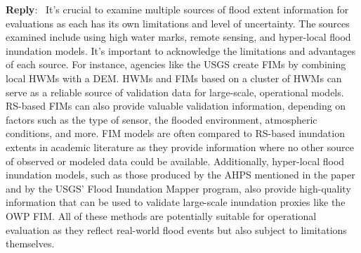 \documentclass[11pt]{article}
\newenvironment{reply}
   {\medskip \noindent \begin{sf}\textbf{Reply}:\  }
   {\medskip \end{sf}}
\begin{document}
\begin{reply}
It's crucial to examine multiple sources of flood extent information for evaluations as each has its own limitations and level of uncertainty.
The sources examined include using high water marks, remote sensing, and hyper-local flood inundation models.
It's important to acknowledge the limitations and advantages of each source.
For instance, agencies like the USGS create FIMs by combining local HWMs with a DEM.
HWMs and FIMs based on a cluster of HWMs can serve as a reliable source of validation data for large-scale, operational models.
RS-based FIMs can also provide valuable validation information, depending on factors such as the type of sensor, the flooded environment, atmospheric conditions, and more.
FIM models are often compared to RS-based inundation extents in academic literature as they provide information where no other source of observed or modeled data could be available.
Additionally, hyper-local flood inundation models, such as those produced by the AHPS mentioned in the paper and by the USGS' Flood Inundation Mapper program, also provide high-quality information that can be used to validate large-scale inundation proxies like the OWP FIM.
All of these methods are potentially suitable for operational evaluation as they reflect real-world flood events but also subject to limitations themselves.


\end{reply}
\end{document}
